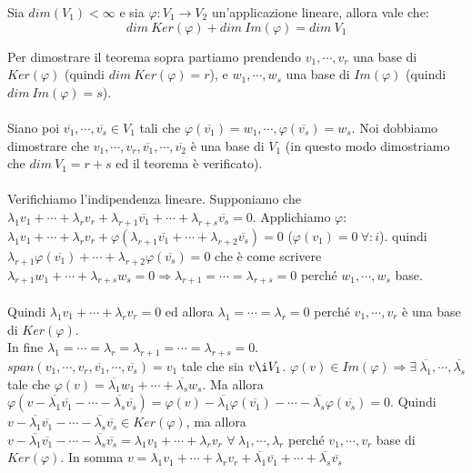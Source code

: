 \begin{theorem}
Sia $dim(V_1) < \infty$ e sia $\varphi: V_1 \to V_2$ un'applicazione lineare, allora vale che:
\[dim\: Ker(\varphi) + dim \: Im(\varphi) = dim \: V_1\]
\end{theorem}

\begin{demostration}
Per dimostrare il teorema sopra partiamo prendendo $v_1, \cdots, v_r$ una base di $Ker(\varphi)$ (quindi $dim\:Ker(\varphi) = r$), e $w_1, \cdots, w_s$ una base di $Im(\varphi)$ (quindi $dim\:Im(\varphi) = s$). \\\\
Siano poi $\overline{v_1}, \cdots, \overline{v_s} \in V_1$ tali che $\varphi(\overline{v_1}) = w_1, \cdots, \varphi(\overline{v_s}) = w_s$. Noi dobbiamo dimostrare che $v_1, \cdots, v_r, \overline{v_1}, \cdots, \overline{v_2}$ è una base di $V_1$ (in questo modo dimostriamo che $dim\:V_1 = r + s$ ed il teorema è verificato).\\\\
Verifichiamo l'indipendenza lineare. Supponiamo che $\lambda_1 v_1 + \cdots + \lambda_r v_r + \lambda_{r+1}\overline{v_1} + \cdots + \lambda_{r+s}\overline{v_s} = 0$. Applichiamo $\varphi$: $\lambda_1 v_1 + \cdots + \lambda_r v_r + \varphi(\lambda_{r+1}\overline{v_1} + \cdots + \lambda_{r+2}\overline{v_s}) = 0$ ($\varphi(v_1) = 0 \:\forall : i$). quindi $\lambda_{r+1}\varphi(\overline{v_1}) + \cdots + \lambda_{r+2}\varphi(\overline{v_s}) = 0$ che è come scrivere $\lambda_{r+1}w_1 + \cdots + \lambda_{r+s}w_s = 0 \Longrightarrow \lambda_{r+1} = \cdots = \lambda_{r+s} = 0$ perché $w_1, \cdots, w_s$ base.\\\\
Quindi $\lambda_1 v_1 + \cdots + \lambda_r v_r = 0$ ed allora $\lambda_1 = \cdots = \lambda_r = 0$ perché $v_1, \cdots, v_r$ è una base di $Ker(\varphi)$.\\
In fine $\lambda_1 = \cdots = \lambda_r = \lambda_{r+1} = \cdots = \lambda_{r+s} = 0$.\\
$span(v_1, \cdots, v_r, \overline{v_1}, \cdots, \overline{v_s}) = v_1$ tale che sia $v \i V_1$. $\varphi(v) \in Im(\varphi) \Longrightarrow \exists \: \overline{\lambda_1}, \cdots, \overline{\lambda_s}$ tale che $\varphi(v) = \overline{\lambda_1}w_1 + \cdots + \overline{\lambda_s}w_s$. Ma allora $\varphi(v - \overline{\lambda_1}\overline{v_1} - \cdots - \overline{\lambda_s}\overline{v_s}) = \varphi(v) - \overline{\lambda_1}\varphi(\overline{v_1}) - \cdots - \overline{\lambda_s}\varphi(\overline{v_s}) = 0$. Quindi $v - \overline{\lambda_1}\overline{v_1} - \cdots - \overline{\lambda_s}\overline{v_s} \in Ker(\varphi)$, ma allora $v - \overline{\lambda_1}\overline{v_1} - \cdots - \overline{\lambda_s}\overline{v_s} = \lambda_1 v_1 + \cdots + \lambda_r v_r$ $\forall \: \lambda_{1}, \cdots, \lambda_r$ perché $v_1, \cdots, v_r$ base di $Ker(\varphi)$. In somma $v = \lambda_1 v_1 + \cdots + \lambda_r v_r + \overline{\lambda_1}\overline{v_1} + \cdots + \overline{\lambda_s}\overline{v_s}$
\end{demostration}